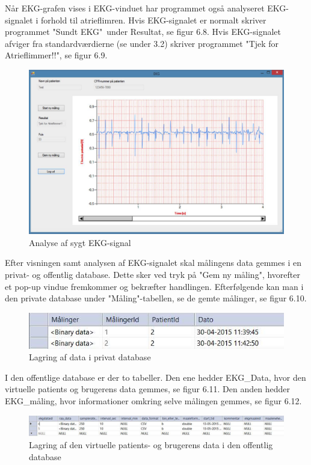 Når EKG-grafen vises i EKG-vinduet har programmet også analyseret EKG-signalet i forhold til atrieflimren. Hvis EKG-signalet er normalt skriver programmet "Sundt EKG"\  under Resultat, se figur 6.8. Hvis EKG-signalet afviger fra standardværdierne (se under 3.2) skriver programmet "Tjek for Atrieflimmer!!", se figur 6.9. 

\begin{figure}[H]
	\centering
	\includegraphics[width=1\textwidth]{Figurer/Snip20150525_26}
	\caption{Analyse af sygt EKG-signal}
\end{figure}

Efter visningen samt analysen af EKG-signalet skal målingens data gemmes i en privat- og offentlig database. Dette sker ved tryk på "Gem ny måling", hvorefter et pop-up vindue fremkommer og bekræfter handlingen. Efterfølgende kan man i den private database under "Måling"\--tabellen, se de gemte målinger, se figur 6.10.   

\begin{figure}[H]
	\centering
	\includegraphics[width=1\textwidth]{Figurer/Snip20150525_27}	
	\caption{Lagring af data i privat database}
\end{figure}

I den offentlige database er der to tabeller. Den ene hedder EKG\_Data, hvor den virtuelle patients og brugerens data gemmes, se figur 6.11. Den anden hedder EKG\_måling, hvor informationer omkring selve målingen gemmes, se figur 6.12. 

\begin{figure}[H]
	\centering
	\includegraphics[width=1\textwidth]{Figurer/Snip20150525_28}
	\caption{Lagring af den virtuelle patients- og brugerens data i den offentlig database}
\end{figure}

